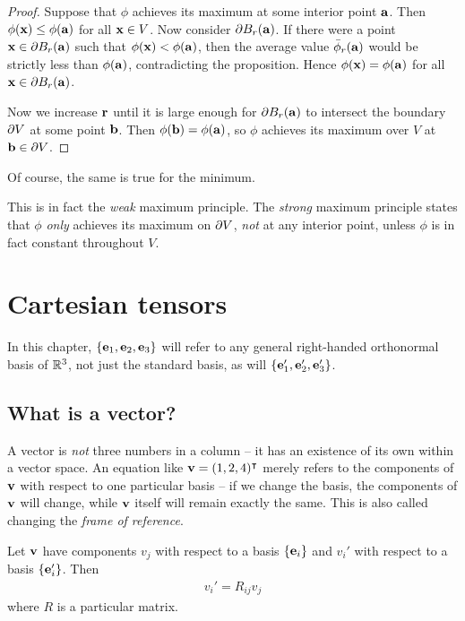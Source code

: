 \documentclass{../../template/note}
\begin{document}
    \begin{proof}
        Suppose that \(\phi\) achieves its maximum at some interior point \(\V a\). Then \(\phi(\V x) \leq \phi(\V a)\) for all \(\V x \in V\). Now consider \(\pr B_r(\V a)\). If there were a point \(\V x \in \pr B_r(\V a)\) such that \(\phi(\V x) < \phi(\V a)\), then the average value \(\bar\phi_r(\V a)\) would be strictly less than \(\phi(\V a)\), contradicting the proposition. Hence \(\phi(\V x) = \phi(\V a)\) for all \(\V x \in \pr B_r(\V a)\).

        Now we increase \(\V r\) until it is large enough for \(\pr B_r(\V a)\) to intersect the boundary \(\partial V\) at some point \(\V b\). Then \(\phi(\V b) = \phi(\V a)\), so \(\phi\) achieves its maximum over \(V\) at \(\V b \in \pr V\).
    \end{proof}
    
    Of course, the same is true for the minimum.

    \begin{remark*}
        This is in fact the \emph{weak} maximum principle. The \emph{strong} maximum principle states that \(\phi\) \emph{only} achieves its maximum on \(\partial V\), \emph{not} at any interior point, unless \(\phi\) is in fact constant throughout \(V\).
    \end{remark*}
    
    \section{Cartesian tensors}

    In this chapter, \(\{\V e_1, \V e_2, \V e_3\}\) will refer to any general right-handed orthonormal basis of \(\mathbb R^3\), not just the standard basis, as will \(\{\V e_1', \V e_2', \V e_3'\}\).

    \subsection{What is a vector?}

    A vector is \emph{not} three numbers in a column -- it has an existence of its own within a vector space. An equation like \(\V v = (1, 2, 4)^\intercal\) merely refers to the components of \(\V v\) with respect to one particular basis -- if we change the basis, the components of \(\V v\) will change, while \(\V v\) itself will remain exactly the same. This is also called changing the \emph{frame of reference}.

    \begin{proposition}
        \label{transformation-rule}
        Let \(\V v\) have components \(v_j\) with respect to a basis \(\{\V e_i\}\) and \(v_i'\) with respect to a basis \(\{\V e_i'\}\). Then
        \begin{align*}
            v_i' = R_{ij} v_j
        \end{align*}
        where \(R\) is a particular matrix.
    \end{proposition}
\end{document}
